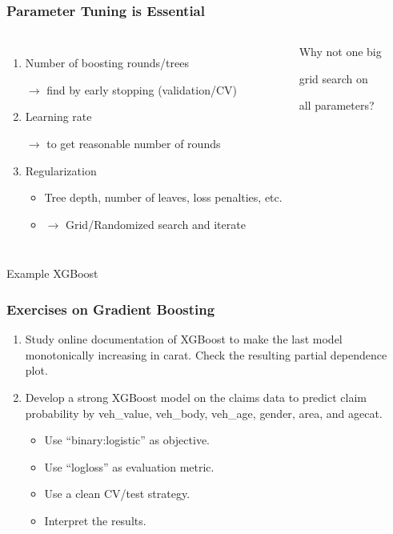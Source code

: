 \documentclass[
    utf8,
    aspectratio=169
]{beamer}  %
\begin{document}
\begin{frame}
	\frametitle{Parameter Tuning is Essential}
	\begin{columns}[onlytextwidth]
		\begin{enumerate}
			\item Number of boosting rounds/trees 
			
			$\rightarrow$ find by early stopping (validation/CV)
			\item Learning rate 
			
			$\rightarrow$ to get reasonable number of rounds
			\item Regularization
				\begin{itemize}
					\item Tree depth, number of leaves, loss penalties, etc.
					\item $\rightarrow$ Grid/Randomized search and iterate
				\end{itemize}
		\end{enumerate}
		\begin{alertblock}{Why not one big 
				
				grid search on 
				
				all parameters?}
		\end{alertblock}
	\end{columns}

	\vfill
	
	\begin{exampleblock}{\centering Example XGBoost}
	\end{exampleblock}
\end{frame}

\begin{frame}
	\frametitle{Exercises on Gradient Boosting}
	\begin{enumerate}
		\item Study online documentation of XGBoost to make the last model monotonically increasing in carat. Check the resulting partial dependence plot.
		
		\vfill
		
		\item Develop a strong XGBoost model on the claims data to predict claim probability by {\ttfamily veh\_value}, {\ttfamily veh\_body}, {\ttfamily veh\_age}, {\ttfamily gender}, {\ttfamily area}, and {\ttfamily agecat}.
		\begin{itemize}
			\item Use \alert{{\ttfamily ``binary:logistic''}} as objective.
			\item Use \alert{{\ttfamily ``logloss''}} as evaluation metric.
			\item Use a clean CV/test strategy.
			\item Interpret the results.
		\end{itemize}
	\end{enumerate}
\end{frame}
\end{document}
